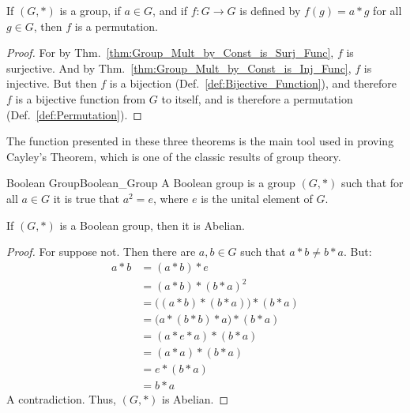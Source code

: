     \begin{theorem}
        If $(G,*)$ is a group, if $a\in{G}$, and if $f:G\rightarrow{G}$ is
        defined by $f(g)=a*g$ for all $g\in{G}$, then $f$ is a permutation.
    \end{theorem}
    \begin{proof}
        For by Thm.~\ref{thm:Group_Mult_by_Const_is_Surj_Func}, $f$ is
        surjective. And by Thm.~\ref{thm:Group_Mult_by_Const_is_Inj_Func},
        $f$ is injective. But then $f$ is a bijection
        (Def.~\ref{def:Bijective_Function}), and therefore $f$ is a bijective
        function from $G$ to itself, and is therefore a permutation
        (Def.~\ref{def:Permutation}).
    \end{proof}
    The function presented in these three theorems is the main tool used in
    proving Cayley's Theorem, which is one of the
    classic results of group theory.
    \begin{fdefinition}{Boolean Group}{Boolean_Group}
        A Boolean group is a group $(G,*)$ such that for all $a\in{G}$ it is
        true that $a^{2}=e$, where $e$ is the unital element of $G$.
    \end{fdefinition}
    \begin{theorem}
        If $(G,*)$ is a Boolean group, then it is Abelian.
    \end{theorem}
    \begin{proof}
        For suppose not. Then there are $a,b\in{G}$ such that $a*b\ne{b}*a$.
        But:
        \begin{align}
            a*b&=
            (a*b)*e
            \tag{Identity}\\
            &=(a*b)*(b*a)^{2}
            \tag{Boolean Property}\\
            &=\big((a*b)*(b*a)\big)*(b*a)
            \tag{Associativity}\\
            &=\big(a*(b*b)*a\big)*(b*a)
            \tag{Associativity}\\
            &=(a*e*a)*(b*a)
            \tag{Boolean Property}\\
            &=(a*a)*(b*a)
            \tag{Identity}\\
            &=e*(b*a)
            \tag{Boolean Property}\\
            &=b*a
            \tag{Identity}
        \end{align}
        A contradiction. Thus, $(G,*)$ is Abelian.
    \end{proof}
